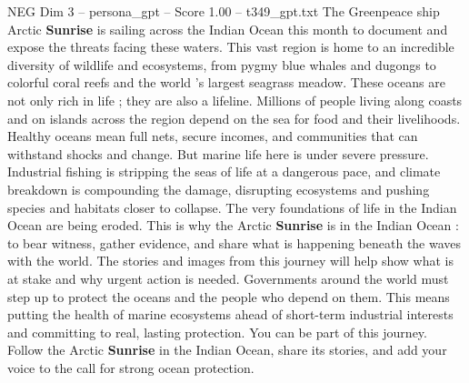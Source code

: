 \begin{textsample}{NEG Dim 3 – persona\_gpt – Score 1.00 – t349\_gpt.txt}  \label{ex:f3_neg_039}
The Greenpeace ship Arctic \textbf{Sunrise} is sailing across the Indian Ocean this month to document and expose the threats facing these waters.
This vast region is home to an incredible diversity of wildlife and ecosystems, from pygmy blue whales and dugongs to colorful coral reefs and the world ’s largest seagrass meadow.
These oceans are not only rich in life ; they are also a lifeline.
Millions of people living along coasts and on islands across the region depend on the sea for food and their livelihoods.
Healthy oceans mean full nets, secure incomes, and communities that can withstand shocks and change.
But marine life here is under severe pressure.
Industrial fishing is stripping the seas of life at a dangerous pace, and climate breakdown is compounding the damage, disrupting ecosystems and pushing species and habitats closer to collapse.
The very foundations of life in the Indian Ocean are being eroded.
This is why the Arctic \textbf{Sunrise} is in the Indian Ocean : to bear witness, gather evidence, and share what is happening beneath the waves with the world.
The stories and images from this journey will help show what is at stake and why urgent action is needed.
Governments around the world must step up to protect the oceans and the people who depend on them.
This means putting the health of marine ecosystems ahead of short-term industrial interests and committing to real, lasting protection.
You can be part of this journey.
Follow the Arctic \textbf{Sunrise} in the Indian Ocean, share its stories, and add your voice to the call for strong ocean protection.

\end{textsample}

